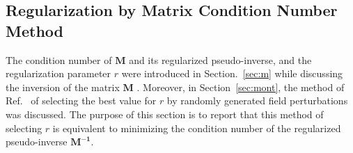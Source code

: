 
\subsection{Regularization by Matrix Condition Number Method  }\label{sec:cond}



The condition number of $\bm{M}$ and its regularized pseudo-inverse,
and the regularization parameter $r$ were introduced in
Section.~\ref{sec:m} while discussing the inversion of the matrix
$\bm{M}$ . Moreover, in Section~\ref{sec:mont}, the method of
Ref.~\cite{bea} of selecting the best value for $r$ by randomly
generated field perturbations was discussed.  The purpose of this
section is to report that this method of selecting $r$ is equivalent
to minimizing the condition number of the regularized pseudo-inverse
$\bm{M^{-1}}$.

 
